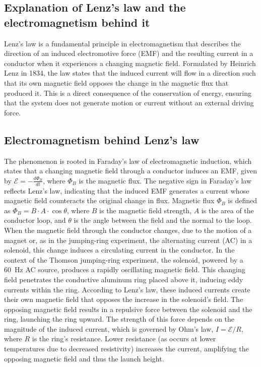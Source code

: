 \documentclass[11pt]{article}
\begin{document}
\subsection*{Explanation of Lenz's law and the electromagnetism behind it}

Lenz's law is a fundamental principle in electromagnetism that describes the direction of an
induced electromotive force (EMF) and the resulting current in a conductor when it experiences a
changing magnetic field. Formulated by Heinrich Lenz in 1834, the law states that the induced
current will flow in a direction such that its own magnetic field opposes the change in the
magnetic flux that produced it. This is a direct consequence of the conservation of energy,
ensuring that the system does not generate motion or current without an external driving force.

\subsection*{Electromagnetism behind Lenz's law}

The phenomenon is rooted in Faraday's law of electromagnetic induction, which states that a
changing magnetic field through a conductor induces an EMF, given by
$\mathcal{E} = -\frac{d\Phi_B}{dt}$, where $\Phi_B$ is the magnetic flux. The negative sign in
Faraday's law reflects Lenz's law, indicating that the induced EMF generates a current whose
magnetic field counteracts the original change in flux. Magnetic flux $\Phi_B$ is defined as
$\Phi_B = B \cdot A \cdot \cos\theta$, where $B$ is the magnetic field strength, $A$ is the area of
the conductor loop, and $\theta$ is the angle between the field and the normal to the loop. When
the magnetic field through the conductor changes, due to the motion of a magnet or, as in the
jumping-ring experiment, the alternating current (AC) in a solenoid, this change induces a
circulating current in the conductor. In the context of the Thomson jumping-ring experiment, the
solenoid, powered by a 60~Hz AC source, produces a rapidly oscillating magnetic field. This
changing field penetrates the conductive aluminum ring placed above it, inducing eddy currents
within the ring. According to Lenz's law, these induced currents create their own magnetic field
that opposes the increase in the solenoid's field. The opposing magnetic field results in a
repulsive force between the solenoid and the ring, launching the ring upward. The strength of this
force depends on the magnitude of the induced current, which is governed by Ohm's law,
$I = \mathcal{E}/R$, where $R$ is the ring's resistance. Lower resistance (as occurs at lower
temperatures due to decreased resistivity) increases the current, amplifying the opposing magnetic
field and thus the launch height.
\end{document}
